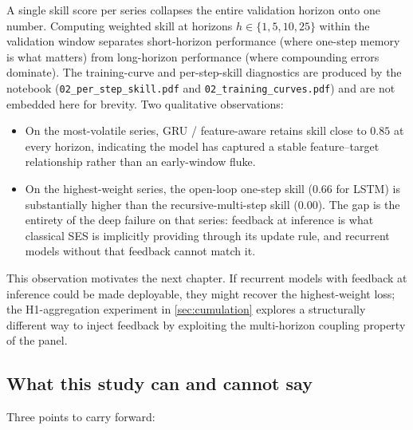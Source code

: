 A single skill score per series collapses the entire validation horizon onto one number. Computing weighted skill at horizons $h \in \{1, 5, 10, 25\}$ within the validation window separates short-horizon performance (where one-step memory is what matters) from long-horizon performance (where compounding errors dominate). The training-curve and per-step-skill diagnostics are produced by the notebook (\texttt{02\_per\_step\_skill.pdf} and \texttt{02\_training\_curves.pdf}) and are not embedded here for brevity. Two qualitative observations:

\begin{itemize}
  \item On the most-volatile series, GRU / feature-aware retains skill close to $0.85$ at every horizon, indicating the model has captured a stable feature--target relationship rather than an early-window fluke.
  \item On the highest-weight series, the open-loop one-step skill ($0.66$ for LSTM) is substantially higher than the recursive-multi-step skill ($0.00$). The gap is the entirety of the deep failure on that series: feedback at inference is what classical SES is implicitly providing through its update rule, and recurrent models without that feedback cannot match it.
\end{itemize}

This observation motivates the next chapter. If recurrent models with feedback at inference could be made deployable, they might recover the highest-weight loss; the H1-aggregation experiment in \cref{sec:cumulation} explores a structurally different way to inject feedback by exploiting the multi-horizon coupling property of the panel.

\subsection{What this study can and cannot say}
\label{sec:deep:conclusions}

Three points to carry forward:

